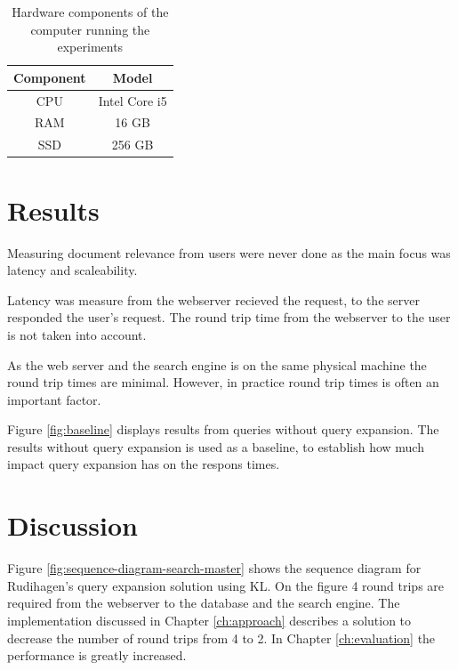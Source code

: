 \begin{table}[h]
    \centering
    \begin{tabular}{c|c}
      \textbf{Component} & \textbf{Model} \\ \hline
      CPU       & Intel Core i5           \\ \hline
      RAM       & 16 GB                   \\ \hline
      SSD       & 256 GB                  \\ \hline
    \end{tabular}
    \caption{Hardware components of the computer running the experiments}
    \label{tbl:hardware}
\end{table}

\section{Results}
Measuring document relevance from users were never done as the main focus was latency and scaleability.

Latency was measure from the webserver recieved the request, to the server responded the user's request.
The round trip time from the webserver to the user is not taken into account.

As the web server and the search engine is on the same physical machine the round trip times are minimal.
However, in practice round trip times is often an important factor.

Figure \ref{fig:baseline} displays results from queries without query expansion.
The results without query expansion is used as a baseline,
to establish how much impact query expansion has on the respons times.





\section{Discussion}
Figure \ref{fig:sequence-diagram-search-master} shows the sequence diagram for Rudihagen's query expansion solution using KL.
On the figure 4 round trips are required from the webserver to the database and the search engine.
The implementation discussed in Chapter \ref{ch:approach} describes a solution to decrease the number of round trips from 4 to 2.
In Chapter \ref{ch:evaluation} the performance is greatly increased.

